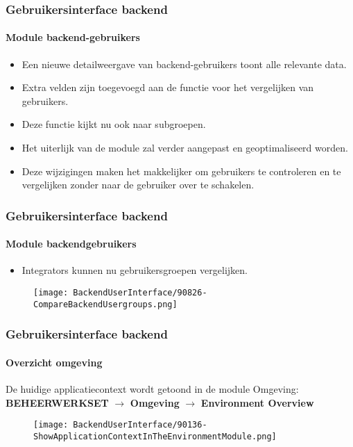 
\begin{frame}[fragile]
	\frametitle{Gebruikersinterface backend}
	\framesubtitle{Module backend-gebruikers}

	\begin{itemize}
		\item Een nieuwe detailweergave van backend-gebruikers toont alle relevante data.
		\item Extra velden zijn toegevoegd aan de functie voor het vergelijken van gebruikers.
		\item Deze functie kijkt nu ook naar subgroepen.
		\item Het uiterlijk van de module zal verder aangepast en geoptimaliseerd worden.
		\item Deze wijzigingen maken het makkelijker om gebruikers te controleren en te
		vergelijken zonder naar de gebruiker over te schakelen.
	\end{itemize}

\end{frame}


\begin{frame}[fragile]
	\frametitle{Gebruikersinterface backend}
	\framesubtitle{Module backendgebruikers}

	\begin{itemize}
		\item Integrators kunnen nu gebruikersgroepen vergelijken.
	\end{itemize}

	\begin{figure}
		\texttt{[image: BackendUserInterface/90826-CompareBackendUsergroups.png]}
	\end{figure}

\end{frame}


\begin{frame}[fragile]
	\frametitle{Gebruikersinterface backend}
	\framesubtitle{Overzicht omgeving}

	De huidige applicatiecontext wordt getoond in de module Omgeving:\newline
	\textbf{BEHEERWERKSET} $\rightarrow$ \textbf{Omgeving} $\rightarrow$ \textbf{Environment Overview}

	\begin{figure}
		\texttt{[image: BackendUserInterface/90136-ShowApplicationContextInTheEnvironmentModule.png]}
	\end{figure}

\end{frame}

